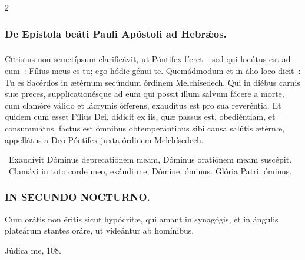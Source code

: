 \documentclass[9pt,twoside]{extarticle}
\begin{document}
\begin{multicols}{2}
\subsubsection*{\center De Epístola beáti Pauli Apóstoli ad Hebrǽos.}
\subsubsection*{\center {}}
\lettrine{C}hristus non semetípsum clarificávit, ut Póntifex fíeret~: sed qui locútus est ad eum~: Fílius meus es tu; ego hódie génui te. Quemádmodum et in álio loco dicit~: Tu es Sacérdos in ætérnum secúndum órdinem Melchísedech. Qui in diébus carnis suæ preces, supplicationésque ad eum qui possit illum salvum fácere a morte, cum clamóre válido et lácrymis ófferens, exaudítus est pro sua reveréntia. Et quidem cum esset Fílius Dei, dídicit ex iis, quæ passus est, obediéntiam, et consummátus, factus est ómnibus obtemperántibus sibi causa salútis ætérnæ, appellátus a Deo Póntifex juxta órdinem Melchísedech.

\begin{tightlist}{}
\item {}~Exaudívit Dóminus deprecatiónem meam, \textred{*} Dóminus oratiónem meam suscépit. ~Clamávi in toto corde meo, exáudi me, Dómine. óminus. Glória Patri. óminus.
\end{tightlist}

\subsubsection*{\center \textsc{IN SECUNDO NOCTURNO.}}
\begin{tightlist}{}
\item {} Cum orátis non éritis sicut hypócritæ, qui amant in synagógis, et in ángulis plateárum stantes oráre, ut videántur ab homínibus.
\item {} Júdica me, 108.
\end{tightlist}

%
%
%
%
%
%
%


\end{multicols}
\end{document}
